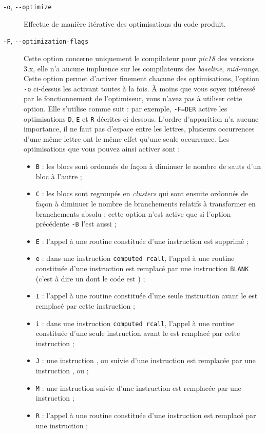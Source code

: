 \begin{description}

  \item[\texttt{-o}, \texttt{-{-}optimize}] Effectue de manière itérative des optimisations du code produit.


  \item[\texttt{-F}, \texttt{-{-}optimization-flags}] Cette option concerne uniquement le compilateur pour \emph{pic18} des versions 3.x, elle n'a aucune impluence sur les compilateurs des \emph{baseline}, \emph{mid-range}. Cette option permet d'activer finement chacune des optimisations, l'option \texttt{-o} ci-dessus les activant toutes à la fois. À moins que vous soyez intéressé par le fonctionnement de l'optimiseur, vous n'avez pas à utiliser cette option. Elle s'utilise comme suit : par exemple, \texttt{-F=DER} active les optimisations \texttt{D}, \texttt{E} et \texttt{R} décrites ci-dessous. L'ordre d'apparition n'a aucune importance, il ne faut pas d'espace entre les lettres, plusieurs occurrences d'une même lettre ont le même effet qu'une seule occurrence. Les optimisations que vous pouvez ainsi activer sont :
\begin{itemize}
  \item \texttt{B} : les blocs sont ordonnés de façon à diminuer le nombre de sauts d'un bloc à l'autre ;
  \item \texttt{C} : les blocs sont regroupés en \emph{clusters} qui sont ensuite ordonnés de façon à diminuer le nombre de branchements relatifs à transformer en branchements absolu ; cette option n'est active que si l'option précédente \texttt{-B} l'est aussi ;
  \item \texttt{E} : l'appel à une routine constituée d'une instruction  est supprimé ;
  \item \texttt{e} : dans une instruction \texttt{computed rcall}, l'appel à une routine constituée d'une instruction  est remplacé par une instruction \texttt{BLANK} (c'est à dire un  dont le code est ) ;
  \item \texttt{I} : l'appel à une routine constituée d'une seule instruction avant le  est remplacé par cette instruction ;
  \item \texttt{i} : dans une instruction \texttt{computed rcall}, l'appel à une routine constituée d'une seule instruction avant le  est remplacé par cette instruction ;
  \item \texttt{J} : une instruction ,  ou  suivie d'une instruction  est remplacée par une instruction ,  ou  ;
  \item \texttt{M} : une instruction  suivie d'une instruction  est remplacée par une instruction  ;
  \item \texttt{R} : l'appel à une routine constituée d'une instruction  est remplacé par une instruction  ;
\end{itemize}




\end{description}
